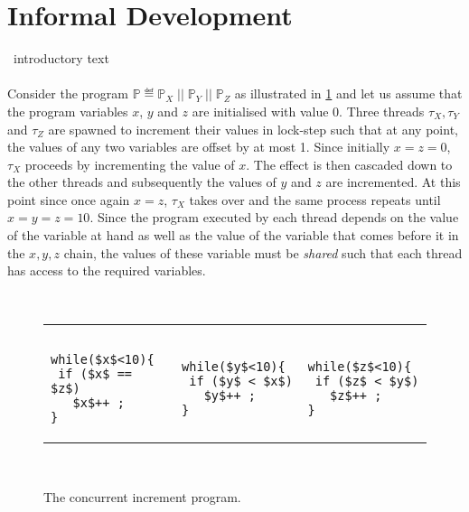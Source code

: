 \section{Informal Development}
\todo\ introductory text\\\\
Consider the program $\mathbb{P} \eqdef \mathbb{P}_X \;\!\!||\;\! \mathbb{P}_Y \;\!\!||\;\! \mathbb{P}_Z$ as illustrated in \fig\ref{fig:concurrentInc} and let us assume that the program variables $x$, $y$ and $z$ are initialised with value $0$. Three threads $\tau_X, \tau_Y$ and $\tau_Z$ are spawned to increment their values in lock-step such that at any point, the values of any two variables are offset by at most 1. Since initially $x=z=0$, $\tau_X$ proceeds by incrementing the value of $x$. The effect is then cascaded down to the other threads and subsequently the values of $y$ and $z$ are incremented. At this point since once again $x = z$, $\tau_X$ takes over and the same process repeats until $x = y = z = 10$. Since the program executed by each thread depends on the value of the variable at hand as well as the value of the variable that comes before it in the $x, y, z$ chain, the values of these variable must be \emph{shared} such that each thread has access to the required variables. 
%
%
\begin{figure}
\noindent\makebox[\linewidth]{\rule{\linewidth}{1pt}} \vspace*{-5pt}\\
\hspace*{-0.2cm}
\begin{tabular}{l || l || l}
	\color{blue}{$\mathbb{P}_X$ :}& 
	\color{blue}{$\mathbb{P}_Y$ :}& 
	\color{blue}{$\mathbb{P}_Z$ :} \\
	 &&\vspace*{-5pt}\\
\begin{lstlisting}[mathescape]
while($x$<10){
 if ($x$ == $z$) 
   $x$++ ;
}
\end{lstlisting}
&
\begin{lstlisting}[mathescape]
while($y$<10){
 if ($y$ < $x$) 
   $y$++ ;
}
\end{lstlisting}
&
\begin{lstlisting}[mathescape]
while($z$<10){
 if ($z$ < $y$) 
   $z$++ ;
}
\end{lstlisting}

\end{tabular} \vspace*{5pt}\\
\noindent\makebox[\linewidth]{\rule{\linewidth}{1pt}} \vspace*{-12pt}
\caption{The concurrent increment program.}
\label{fig:concurrentInc}
\end{figure}
%
%

